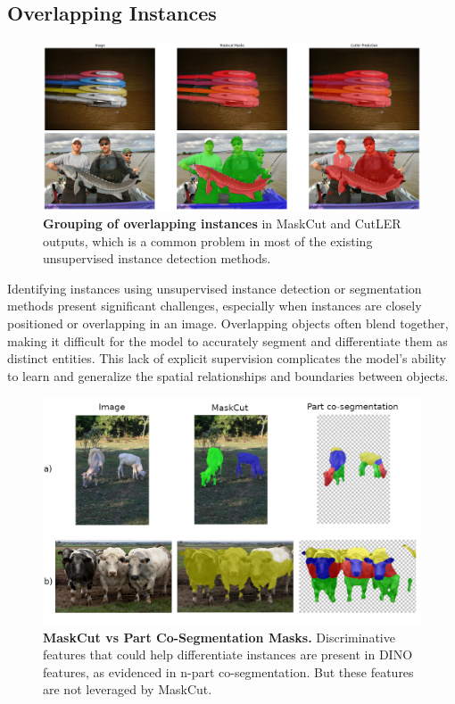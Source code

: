 \subsection{Overlapping Instances}
\begin{figure}
	\centering
	\includegraphics[width=1\textwidth]{Images/main/cutler-prob-overlap.png}
	\caption[\textbf{Cutler's Performance on Images with Overlapping Instances}]{\textbf{Grouping of overlapping instances} in MaskCut and CutLER outputs, which is a common problem in most of the existing unsupervised instance detection methods.}
	\label{fig:cutler_overlapping_instances_eg}
\end{figure}

Identifying instances using unsupervised instance detection or segmentation methods present significant challenges, especially when instances are closely positioned or overlapping in an image. Overlapping objects often blend together, making it difficult for the model to accurately segment and differentiate them as distinct entities. This lack of explicit supervision complicates the model's ability to learn and generalize the spatial relationships and boundaries between objects.

\begin{figure}
	\centering
	\includegraphics[width=1\textwidth]{Images/main/part-cosegm.png}
	\caption[\textbf{MaskCut vs Part Co-Segmentation Masks}]{\textbf{MaskCut vs Part Co-Segmentation Masks.} Discriminative features that could help differentiate instances are present in DINO features, as evidenced in n-part co-segmentation. But these features are not leveraged by MaskCut. }
	\label{fig:maskcut-instance-indifference}
\end{figure}

